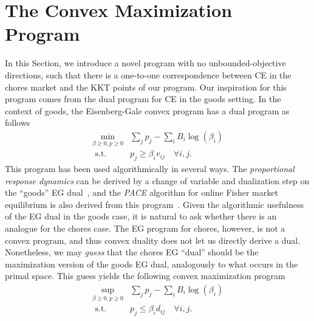 \documentclass[format=acmsmall,authorversion]{acmart}
\newcommand{\ck}[1]{{\textcolor{red}{CK: #1}}}
\newcommand{\ntl}[1]{{\textcolor{teal}{Tianlong: #1}}}
\newcommand{\infd}{unbounded-objective direction}
\begin{document}




\section{The Convex Maximization Program}
\label{Sec:convex-pgm}

In this Section, we introduce a novel program with no \infd s, such that there is a one-to-one correspondence between CE in the chores market and the KKT points of our program. Our inspiration for this program comes from the dual program for CE in the goods setting.  In the context of goods, the Eisenberg-Gale convex program has a dual program as follows~\citep{cole2017convex}
\begin{align*}
    \min_{\beta \geq 0, p \geq 0} &\sum_j p_j - \sum_i B_i \log(\beta_i) \\
    \text{ s.t. } & p_j \geq \beta_i v_{ij}\quad  \forall i,j.
\end{align*} 
This program has been used algorithmically in several ways. The \emph{proportional response dynamics} can be derived by a change of variable and dualization step on the ``goods'' EG dual~\citep{zhang2011proportional,birnbaum2011distributed}, and the \emph{PACE} algorithm for online Fisher market equilibrium is also derived from this program~\citep{gao2021online,liao2022nonstationary}.
Given the algorithmic usefulness of the EG dual in the goods case, it is natural to ask whether there is an analogue for the chores case. The EG program for chores, however, is not a convex program, and thus convex duality does not let us directly derive a dual.
Nonetheless, we may \emph{guess} that the chores EG ``dual'' should be the maximization version of the goods EG dual, analogously to what occurs in the primal space.
This guess yields the following convex maximization program
\begin{equation}
\begin{aligned}
    \sup_{\beta \geq 0, p \geq 0} &\sum_j p_j - \sum_i B_i \log(\beta_i) \\
    \text{ s.t. } & p_j \leq \beta_i d_{ij}\quad  \forall i,j.
\end{aligned} 
\tag{Chores Dual}
\label{chores EG dual}
\end{equation}
\end{document}
